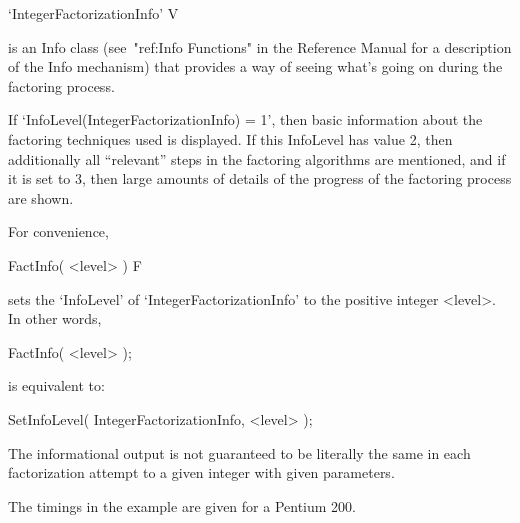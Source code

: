 

\>`IntegerFactorizationInfo' V

is an Info class (see~"ref:Info Functions" in the {\GAP} Reference Manual
for a description of the Info mechanism) that provides a way of seeing
what's going on during the factoring process.

If `InfoLevel(IntegerFactorizationInfo) = 1', then basic information
about the factoring techniques used is displayed. If this InfoLevel has
value 2, then additionally all ``relevant'' steps in the factoring
algorithms are mentioned, and if it is set to 3, then large amounts of
details of the progress of the factoring process are shown. 

For convenience,

\>FactInfo( <level> ) F

sets the `InfoLevel' of `IntegerFactorizationInfo' to the positive integer
<level>. In other words,

FactInfo( <level> );

is equivalent to:

SetInfoLevel( IntegerFactorizationInfo, <level> );

The informational output is not guaranteed to be literally the same in
each factorization attempt to a given integer with given parameters.

The timings in the example are given for a Pentium 200.

